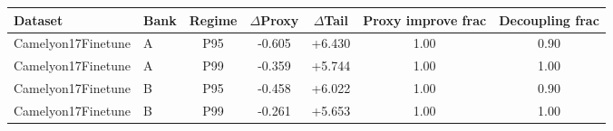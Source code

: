 \begin{tabular}{llccccc}
  \toprule
  Dataset & Bank & Regime & $\Delta$Proxy & $\Delta$Tail & Proxy improve frac & Decoupling frac \\
  \midrule
  Camelyon17Finetune & A & P95 & -0.605 & +6.430 & 1.00 & 0.90 \\
  Camelyon17Finetune & A & P99 & -0.359 & +5.744 & 1.00 & 1.00 \\
  Camelyon17Finetune & B & P95 & -0.458 & +6.022 & 1.00 & 0.90 \\
  Camelyon17Finetune & B & P99 & -0.261 & +5.653 & 1.00 & 1.00 \\
  \bottomrule
\end{tabular}
